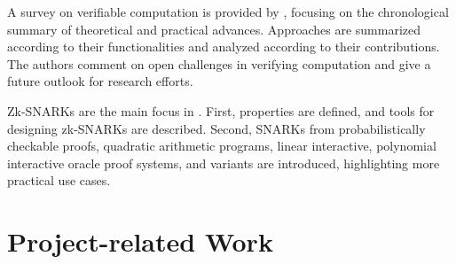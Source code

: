 A survey on verifiable computation is provided by \citet{Ahmad}, focusing on the chronological summary of theoretical and practical advances. Approaches are summarized according to their functionalities and analyzed according to their contributions. The authors comment on open challenges in verifying computation and give a future outlook for research efforts. 

Zk-SNARKs are the main focus in \citet{NitulescuGentleIntroSNARKs}. First, properties are defined, and tools for designing zk-SNARKs are described. Second, SNARKs from probabilistically checkable proofs, quadratic arithmetic programs, linear interactive, polynomial interactive oracle proof systems, and variants are introduced, highlighting more practical use cases. 

\section{Project-related Work}

